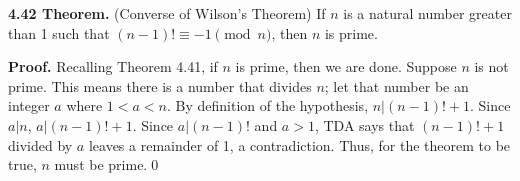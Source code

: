 \documentclass[12pt]{article}
\begin{document}
\noindent\textbf{4.42 Theorem.} (Converse of Wilson's Theorem) If $n$ is a natural number greater than 1 such that $(n-1)! \equiv -1\pmod n$, then $n$ is prime.

\bigskip

\noindent\textbf{Proof.} Recalling Theorem 4.41, if $n$ is prime, then we are done. Suppose $n$ is not prime. This means there is a number that divides $n$; let that number be an integer $a$ where $1<a < n$. By definition of the hypothesis, $n|(n-1)!+1$. Since $a|n$, $a|(n-1)!+1$. Since $a|(n-1)!$ and $a>1$, TDA says that $(n-1)!+1$ divided by $a$ leaves a remainder of 1, a contradiction. Thus, for the theorem to be true, $n$ must be prime.\qed
\end{document}

